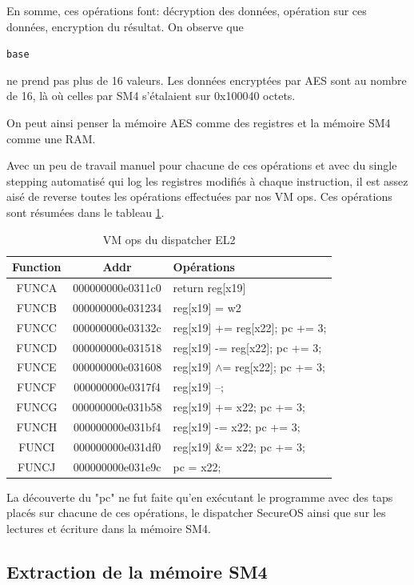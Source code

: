 \documentclass[14pt]{article}
\newcommand{\inlinebox}[2]{%
\colorbox{bg}{%
\parbox[b][0.6em]{\widthof{\texttt{#2}}}{\texttt{#2}}
}
}
\newcommand{\inlinetext}[1]{ \inlinebox{text}{#1} }
\theoremstyle{definition}
\begin{document}
En somme, ces opérations font: décryption des données, opération sur ces données, encryption du résultat.
On observe que \inlinetext{base} ne prend pas plus de 16 valeurs. Les données encryptées par AES sont au nombre de 16, là où celles par SM4 s'étalaient sur 0x100040 octets.

On peut ainsi penser la mémoire AES comme des registres et la mémoire SM4 comme une RAM.


Avec un peu de travail manuel pour chacune de ces opérations et avec du single stepping automatisé qui log les registres modifiés à chaque instruction, il est assez aisé de reverse toutes les opérations effectuées par nos VM ops.
Ces opérations sont résumées dans le tableau \ref{table:el2_funcs}.


\begin{table}[h!]
  \centering
\begin{tabular}{|c|c|l|}
  \hline
  Function & Addr & Opérations \\
  \hline
  FUNCA& 000000000e0311c0 & return reg[x19] \\
  \hline
  FUNCB& 000000000e031234 & reg[x19] = w2 \\
  \hline
  FUNCC& 000000000e03132c & reg[x19] += reg[x22]; pc += 3; \\
  \hline
  FUNCD& 000000000e031518 & reg[x19] -= reg[x22]; pc += 3; \\
  \hline
  FUNCE &000000000e031608 & reg[x19] $\wedge$= reg[x22]; pc += 3; \\
  \hline
  FUNCF &000000000e0317f4 & reg[x19] --; \\ 
  \hline
  FUNCG &000000000e031b58 & reg[x19] += x22; pc += 3; \\
  \hline
  FUNCH &000000000e031bf4 & reg[x19] -= x22; pc += 3; \\
  \hline
  FUNCI &000000000e031df0 & reg[x19] \&= x22; pc += 3; \\
  \hline
  FUNCJ &000000000e031e9c & pc = x22;\\
  \hline
\end{tabular}
  \caption{VM ops du dispatcher EL2}
\label{table:el2_funcs}
\end{table}

La découverte du "pc" ne fut faite qu'en exécutant le programme avec des taps placés sur chacune de ces opérations, le dispatcher SecureOS ainsi que sur les lectures et écriture dans la mémoire SM4.


\subsection{\:Extraction de la mémoire SM4}
\end{document}
